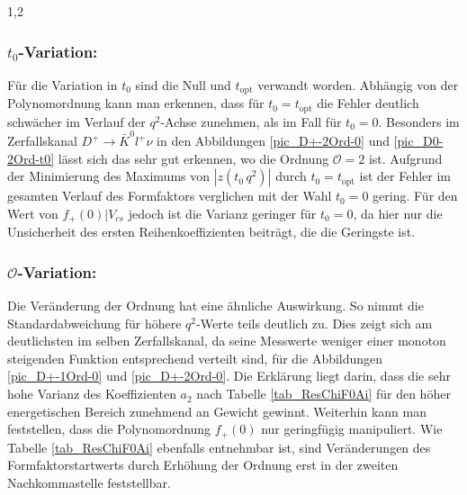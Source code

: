 \documentclass[11pt,a4paper,twoside]{report}
\begin{document}
\begin{spacing}{1,2}
\subsubsection*{$t_0$-Variation:}
Für die Variation in $t_0$ sind die Null und $t_\text{opt}$ verwandt worden. Abhängig von der Polynomordnung kann man erkennen, dass für 
$t_0 = t_\text{opt}$ die Fehler deutlich schwächer im Verlauf der $q^2$-Achse zunehmen, als im Fall für $t_0 = 0$. Besonders im Zerfallskanal $D^+ \rightarrow \bar K^0 l^+ \nu$
in den Abbildungen \ref{pic_D+-2Ord-0} und \ref{pic_D0-2Ord-t0} lässt sich das sehr gut erkennen, wo die Ordnung $\mathcal{O} = 2$ ist. 
Aufgrund der Minimierung des Maximums von $|z(t_0\,q^2)|$ durch $t_0 = t_\text{opt}$ ist der Fehler im gesamten Verlauf des Formfaktors verglichen mit der Wahl
$t_0 = 0$ gering. Für den Wert von $f_+(0)|V_{cs}$ jedoch ist die Varianz geringer für $t_0 = 0$, da hier nur die Unsicherheit des ersten Reihenkoeffizienten
beiträgt, die die Geringste ist.

\subsubsection*{$\mathcal{O}$-Variation:}
Die Veränderung der Ordnung hat eine ähnliche Auswirkung. So nimmt die Standardabweichung für höhere $q^2$-Werte teils deutlich zu. Dies zeigt sich 
am deutlichsten im selben Zerfallskanal, da seine Messwerte weniger einer monoton steigenden Funktion entsprechend verteilt sind, für die 
Abbildungen \ref{pic_D+-1Ord-0} und \ref{pic_D+-2Ord-0}. Die Erklärung liegt da\-rin, dass die sehr hohe Varianz des Koeffizienten $a_2$ nach Tabelle
\ref{tab_ResChiF0Ai} für den höher energetischen Bereich zunehmend an Gewicht gewinnt. Weiterhin kann man feststellen, dass die Polynomordnung 
$f_+(0)$ nur geringfügig manipuliert. Wie Tabelle \ref{tab_ResChiF0Ai} ebenfalls entnehmbar ist, sind Veränderungen des Formfaktorstartwerts durch 
Erhöhung der Ordnung erst in der zweiten Nachkommastelle feststellbar.


\end{spacing}
\end{document}
